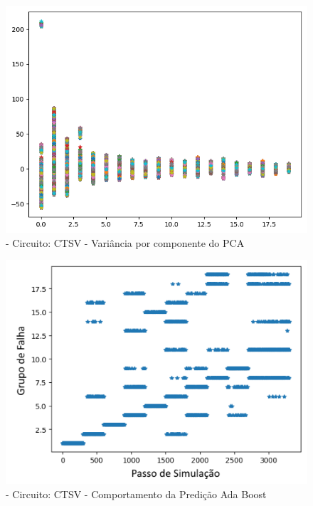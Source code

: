         \begin{figure}[H]
        \begin{center}
        \includegraphics[width=13cm]{./01_Pre_textuais/ctsv_figs/dadosPosPCA_CTSV_mc_+_4bitPRBS_[FALHA]raw.png}
        \caption{\label{fig:pcaAPOSSalenkey}- Circuito: CTSV - Variância por componente do PCA}
        \end{center}
        \end{figure}
        
        \begin{figure}[H]
        \begin{center}
        \includegraphics[width=13cm]{./01_Pre_textuais/ctsv_figs/AdaBoostClassifier_CTSV_mc_+_4bitPRBS_[FALHA]raw.png}
        \caption{\label{fig:DecisionTreeClassifieSalenkey}- Circuito: CTSV - Comportamento da Predição Ada Boost}
        \end{center}
        \end{figure}
       
